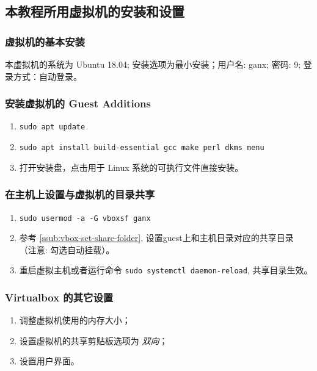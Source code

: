 \documentclass[
    11pt,
    cite=authoryear,
    device=normal,
    lang=cn,
    mode=simple,
    result=answer,
    toc=onecol,
]{elegantbook_sierxue}
\begin{document}
\subsection{本教程所用虚拟机的安装和设置}%
\label{sub:vbox-vm-install-set}

\subsubsection{虚拟机的基本安装}%
\label{ssub:linux-ubuntu}

本虚拟机的系统为 Ubuntu 18.04; 安装选项为最小安装；用户名: ganx; 密码: 9;
登录方式：自动登录。

\subsubsection{安装虚拟机的 Guest Additions}%
\label{ssub:vbox-guest-additions}
\begin{enumerate}
    \item \lstinline{sudo apt update}
    \item \lstinline{sudo apt install build-essential gcc make perl dkms menu}
    \item 打开安装盘，点击用于 Linux 系统的可执行文件直接安装。
\end{enumerate}

\subsubsection{在主机上设置与虚拟机的目录共享}%
\label{ssub:vbox-shared-folder}
\begin{enumerate}
    \item \lstinline{sudo usermod -a -G vboxsf ganx}
    \item 参考 \ref{ssub:vbox-set-share-folder},
        设置guest上和主机目录对应的共享目录 （注意: 勾选自动挂载）。
    \item 重启虚拟主机或者运行命令 \lstinline{sudo systemctl daemon-reload},
        共享目录生效。
\end{enumerate}

\subsubsection{Virtualbox 的其它设置}%
\label{ssub:vbox-others}
\begin{enumerate}
    \item 调整虚拟机使用的内存大小；
    \item 设置虚拟机的共享剪贴板选项为 \emph{双向}；
    \item 设置用户界面。
\end{enumerate}
\end{document}
